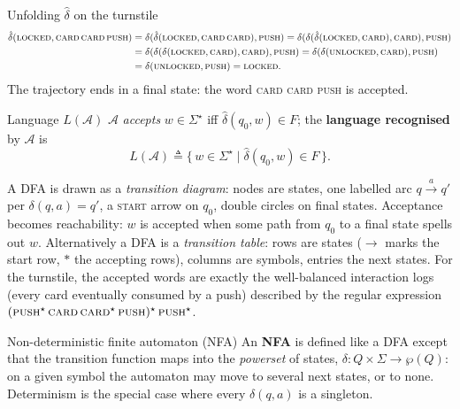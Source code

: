 \begin{examplebox}{Unfolding $\hat{\delta}$ on the turnstile}
\begin{align*}
  \hat{\delta}(\textsc{locked}, \textsc{card}\,\textsc{card}\,\textsc{push})
  &= \delta(\hat{\delta}(\textsc{locked}, \textsc{card}\,\textsc{card}), \textsc{push})
   = \delta(\delta(\hat{\delta}(\textsc{locked}, \textsc{card}), \textsc{card}), \textsc{push}) \\
  &= \delta(\delta(\delta(\textsc{locked}, \textsc{card}), \textsc{card}), \textsc{push})
   = \delta(\delta(\textsc{unlocked}, \textsc{card}), \textsc{push}) \\
  &= \delta(\textsc{unlocked}, \textsc{push}) = \textsc{locked}.
\end{align*}
The trajectory ends in a final state: the word \textsc{card card push} is accepted.
\end{examplebox}

\begin{definitionbox}{Language $L(\mathcal{A})$}
$\mathcal{A}$ \emph{accepts} $w \in \Sigma^\star$ iff $\hat{\delta}(q_0, w) \in F$; the \textbf{language recognised} by $\mathcal{A}$ is
\[
  L(\mathcal{A}) \triangleq \{\, w \in \Sigma^\star \mid \hat{\delta}(q_0, w) \in F \,\}.
\]
\end{definitionbox}

A DFA is drawn as a \emph{transition diagram}: nodes are states, one labelled arc $q \xrightarrow{a} q'$ per $\delta(q, a) = q'$, a \textsc{start} arrow on $q_0$, double circles on final states. Acceptance becomes reachability: $w$ is accepted when some path from $q_0$ to a final state spells out $w$. Alternatively a DFA is a \emph{transition table}: rows are states ($\rightarrow$ marks the start row, $\ast$ the accepting rows), columns are symbols, entries the next states. For the turnstile, the accepted words are exactly the well-balanced interaction logs (every card eventually consumed by a push) described by the regular expression $(\textsc{push}^\star\,\textsc{card}\,\textsc{card}^\star\,\textsc{push})^\star\,\textsc{push}^\star$.

\begin{definitionbox}{Non-deterministic finite automaton (NFA)}
An \textbf{NFA} is defined like a DFA except that the transition function maps into the \emph{powerset} of states, $\delta : Q \times \Sigma \to \wp(Q)$: on a given symbol the automaton may move to several next states, or to none. Determinism is the special case where every $\delta(q, a)$ is a singleton.
\end{definitionbox}

